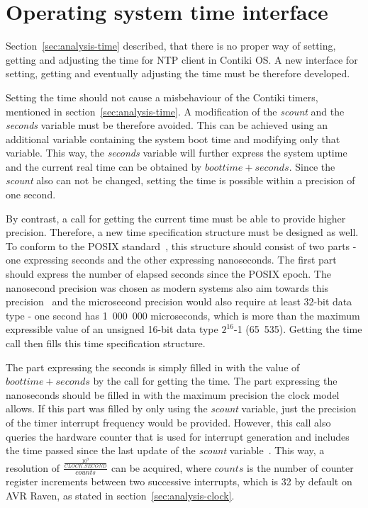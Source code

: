 
\section{Operating system time interface}\label{sec:analysis-interface}
Section~\ref{sec:analysis-time} described, that there is no proper
way of setting, getting and adjusting the time for NTP client in Contiki OS.
A new interface for setting, getting and eventually adjusting the time
must be therefore developed.

Setting the time should not cause a misbehaviour of the Contiki timers,
mentioned in section~\ref{sec:analysis-time}.
A modification of the {\it{scount}} and the {\it{seconds}} variable must be therefore avoided.
This can be achieved using an additional variable containing the system boot time
and modifying only that variable.
This way, the {\it{seconds}} variable will further express the system uptime
and the current real time can be obtained by $boottime + seconds$.
Since the {\it{scount}} also can not be changed, setting the time is possible
within a precision of one second.

By contrast, a call for getting the current time must be able to provide higher precision.
Therefore, a new time specification structure must be designed as well.
To conform to the POSIX standard~\cite{posix}, this structure should consist of two parts -
one expressing seconds and the other expressing nanoseconds.
The first part should express the number of elapsed seconds since the POSIX epoch.
The nanosecond precision was chosen as modern systems also aim towards this
precision~\cite{posix,ntp-precision} and
the microsecond precision would also require at least 32-bit data type -
one second has 1~000~000 microseconds, which is more than the maximum expressible value of
an unsigned 16-bit data type $2^{16}$-1 (65~535).
Getting the time call then fills this time specification structure.

The part expressing the seconds is simply filled in with the value of $boottime + seconds$
by the call for getting the time.
The part expressing the nanoseconds should be filled in with the maximum precision
the clock model allows.
If this part was filled by only using the {\it{scount}} variable,
just the precision of the timer interrupt frequency would be provided.
However, this call also queries the hardware counter that is used for
interrupt generation and includes the time passed since
the last update of the {\it{scount}} variable~\cite{thesis-beat}.
This way, a resolution of $\frac{\frac{10^9}{CLOCK\_SECOND}}{counts}$ can be acquired,
where $counts$ is the number of counter register increments between two successive interrupts,
which is 32 by default on AVR Raven, as stated in section~\ref{sec:analysis-clock}.

